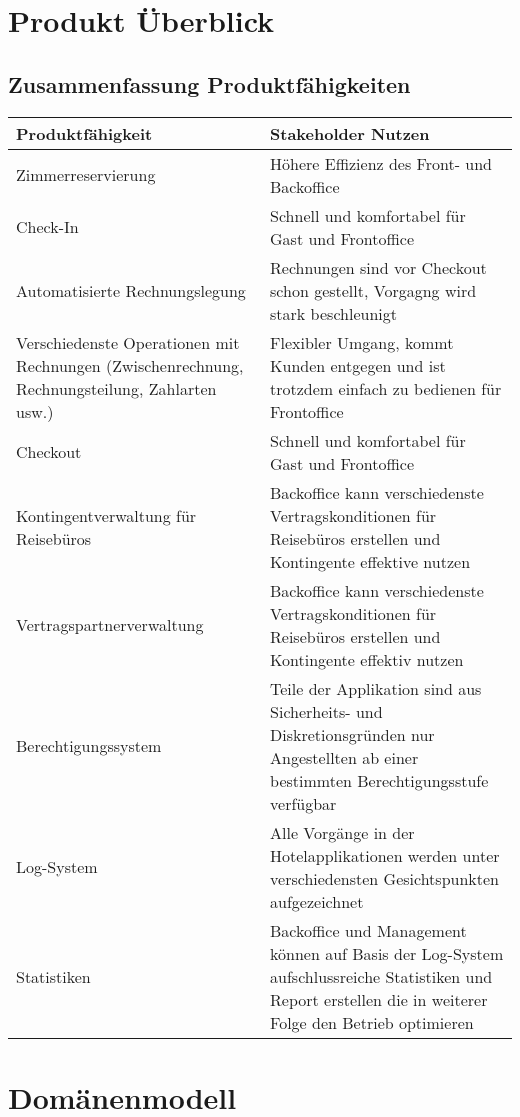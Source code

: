 \documentclass[10pt,a4paper,titlepage]{article}
\begin{document}
\newpage

\section{Produkt Überblick}
\subsection{Zusammenfassung Produktfähigkeiten}
\begin{tabular}{|p{5.7cm}|p{5.7cm}|}
	\hline
	\textbf{Produktfähigkeit} &
	\textbf{Stakeholder Nutzen}
	\\
	\hline
	Zimmerreservierung &
	Höhere Effizienz des Front- und Backoffice
	\\
	\hline
	Check-In &
	Schnell und komfortabel für Gast und Frontoffice
	\\
	\hline
	Automatisierte Rechnungslegung &
	Rechnungen sind vor Checkout schon gestellt, Vorgagng wird stark beschleunigt
	\\
	\hline
	Verschiedenste Operationen mit Rechnungen (Zwischenrechnung, Rechnungsteilung, Zahlarten usw.) &
	Flexibler Umgang, kommt Kunden entgegen und ist trotzdem einfach zu bedienen für Frontoffice
	\\
	\hline
	Checkout &
	Schnell und komfortabel für Gast und Frontoffice
	\\
	\hline
	Kontingentverwaltung für Reisebüros &
	Backoffice kann verschiedenste Vertragskonditionen für Reisebüros erstellen und Kontingente effektive nutzen
	\\
	\hline
	Vertragspartnerverwaltung &
	Backoffice kann verschiedenste Vertragskonditionen für Reisebüros erstellen und Kontingente effektiv nutzen
	\\
	\hline
	Berechtigungssystem &
	Teile der Applikation sind aus Sicherheits- und Diskretionsgründen nur Angestellten ab einer bestimmten Berechtigungsstufe verfügbar
	\\
	\hline
	Log-System &
	Alle Vorgänge in der Hotelapplikationen werden unter verschiedensten Gesichtspunkten aufgezeichnet
	\\
	\hline
	Statistiken &
	Backoffice und Management können auf Basis der Log-System aufschlussreiche Statistiken und Report erstellen die in weiterer Folge den Betrieb optimieren
	\\
	\hline
\end{tabular}

\newpage

\section{Domänenmodell}
\end{document}
